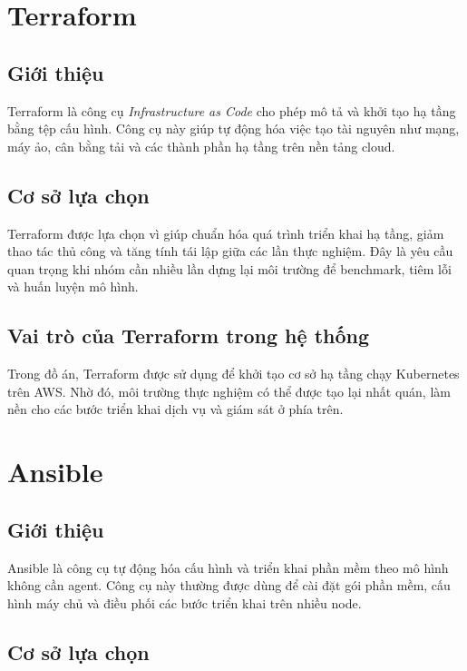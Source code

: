 \section{Terraform}

\subsection{Giới thiệu}

Terraform là công cụ \textit{Infrastructure as Code} cho phép mô tả và khởi tạo hạ tầng bằng tệp cấu hình. Công cụ này giúp tự động hóa việc tạo tài nguyên như mạng, máy ảo, cân bằng tải và các thành phần hạ tầng trên nền tảng cloud.

\subsection{Cơ sở lựa chọn}

Terraform được lựa chọn vì giúp chuẩn hóa quá trình triển khai hạ tầng, giảm thao tác thủ công và tăng tính tái lập giữa các lần thực nghiệm. Đây là yêu cầu quan trọng khi nhóm cần nhiều lần dựng lại môi trường để benchmark, tiêm lỗi và huấn luyện mô hình.

\subsection{Vai trò của Terraform trong hệ thống}

Trong đồ án, Terraform được sử dụng để khởi tạo cơ sở hạ tầng chạy Kubernetes trên AWS. Nhờ đó, môi trường thực nghiệm có thể được tạo lại nhất quán, làm nền cho các bước triển khai dịch vụ và giám sát ở phía trên.

\section{Ansible}

\subsection{Giới thiệu}

Ansible là công cụ tự động hóa cấu hình và triển khai phần mềm theo mô hình không cần agent. Công cụ này thường được dùng để cài đặt gói phần mềm, cấu hình máy chủ và điều phối các bước triển khai trên nhiều node.

\subsection{Cơ sở lựa chọn}

